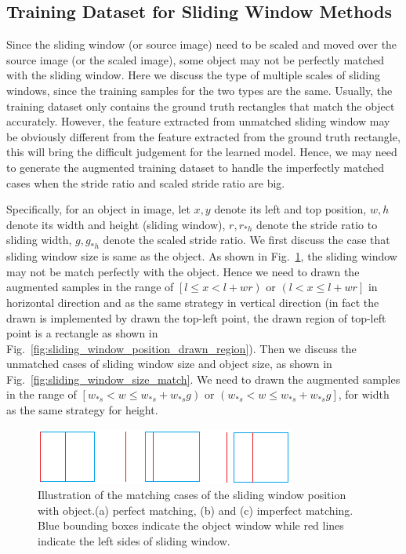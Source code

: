 \documentclass[runningheads,openany]{xhlPaper}
\begin{document}
\subsection{Training Dataset for Sliding Window Methods}
Since the sliding window (or source image) need to be scaled and moved over the source image (or the scaled image), some object may not be perfectly matched with the sliding window.
Here we discuss the type of multiple scales of sliding windows, since the training samples for the two types are the same.
Usually, the training dataset only contains the ground truth rectangles that match the object accurately. However, the feature extracted from unmatched sliding window may be obviously different from the feature extracted from the ground truth rectangle, this will bring the difficult judgement for the learned model.
Hence, we may need to generate the augmented training dataset to handle the imperfectly matched cases when the stride ratio and scaled stride ratio are big.

Specifically, for an object in image, let $x, y$ denote its left and top position, $w, h$ denote its width and height (sliding window), $r, r_{*h}$ denote the stride ratio to sliding width, $g, g_{*h}$ denote the scaled stride ratio. 
We first discuss the case that sliding window size is same as the object. 
As shown in Fig.~\ref{fig:sliding_window_position_match}, the sliding window may not be match perfectly with the object. 
Hence we need to drawn the augmented samples in the range of $\left[ {l \le x < l + wr} \right)$ or $\left( {l < x \le l + wr} \right]$ in horizontal direction and as the same strategy in vertical direction (in fact the drawn is implemented by drawn the top-left point, the drawn region of top-left point is a rectangle as shown in Fig.~\ref{fig:sliding_window_position_drawn_region}).
Then we discuss the unmatched cases of sliding window size and object size, as shown in Fig.~\ref{fig:sliding_window_size_match}. 
We need to drawn the augmented samples in the range of $\left[ {{w_{*s}} < w \le {w_{*s}} + {w_{*s}}g} \right)$ or $\left( {{w_{*s}} < w \le {w_{*s}} + {w_{*s}}g} \right]$, for width as the same strategy for height. 

\begin{figure}
\centering
\includegraphics[width=0.6\linewidth]{sliding_window_position_match}
\caption{Illustration of the matching cases of the sliding window position with object.(a) perfect matching, (b) and (c) imperfect matching. Blue bounding boxes indicate the object window while red lines indicate the left sides of sliding window.}
\label{fig:sliding_window_position_match}
\end{figure}
\end{document}

